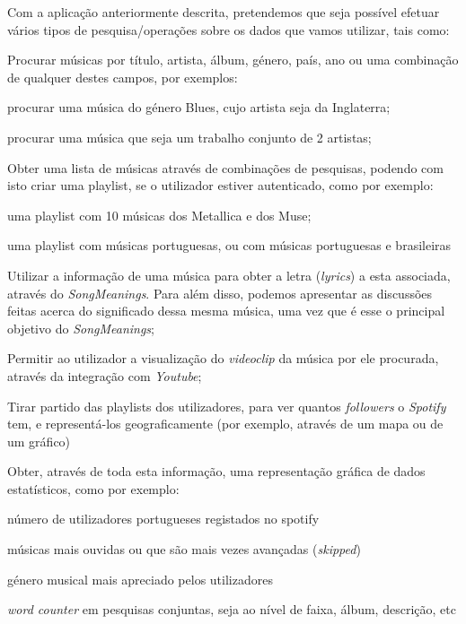 \documentclass[twocolumn,twoside,11pt,a4paper]{article}
\begin{document}
Com a aplicação anteriormente descrita, pretendemos que seja possível efetuar vários
tipos de pesquisa/operações sobre os dados que vamos utilizar, tais como:
\begin{compactitem}
  \item Procurar músicas por título, artista, álbum, género, país, ano ou uma combinação
    de qualquer destes campos, por exemplos:
    \begin{compactitem}
      \item procurar uma música do género Blues, cujo artista seja da Inglaterra;
      \item procurar uma música que seja um trabalho conjunto de 2 artistas;
    \end{compactitem}

  \item Obter uma lista de músicas através de combinações de pesquisas, podendo com
    isto criar uma playlist, se o utilizador estiver autenticado, como por exemplo:
    \begin{compactitem}
      \item uma playlist com 10 músicas dos Metallica e dos Muse;
      \item uma playlist com músicas portuguesas, ou com músicas portuguesas e
        brasileiras
    \end{compactitem}

  \item Utilizar a informação de uma música para obter a letra (\textit{lyrics}) a
    esta associada, através do \textit{SongMeanings}. Para além disso, podemos
    apresentar as discussões feitas acerca do significado dessa mesma música, uma vez
    que é esse o principal objetivo do \textit{SongMeanings};
    \item Permitir ao utilizador a visualização do \textit{videoclip} da música por ele procurada, através da integração com \textit{Youtube};
  \item Tirar partido das playlists dos utilizadores, para ver quantos \textit{followers}
    o \textit{Spotify} tem, e representá-los geograficamente (por exemplo, através de
      um mapa ou de um gráfico)
  \item Obter, através de toda esta informação, uma representação gráfica de dados
    estatísticos, como por exemplo:
    \begin{compactitem}
      \item número de utilizadores portugueses registados no spotify
      \item músicas mais ouvidas ou que são mais vezes avançadas (\textit{skipped})
      \item género musical mais apreciado pelos utilizadores
      \item \textit{word counter} em pesquisas conjuntas, seja ao nível de faixa, álbum,
        descrição, etc
    \end{compactitem}
\end{compactitem}
\end{document}
